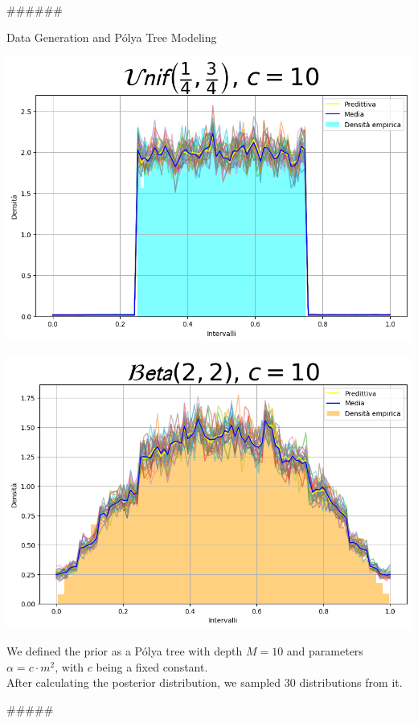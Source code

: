 \documentclass{beamer}
\begin{document}
######

\begin{frame}{Data Generation and Pólya Tree Modeling}
\begin{minipage}{0.5\textwidth}
    \includegraphics[width=\textwidth]{Unif1.png}

    \bigskip
    
    \includegraphics[width=\textwidth]{Gaus1.png}

  \end{minipage}
  \hfill
  \begin{minipage}{0.45\textwidth}
    We defined the prior as a Pólya tree with depth \( M = 10 \) and parameters \( \alpha = c \cdot m^2 \), with \( c \) being a fixed constant. \\
    
    After calculating the posterior distribution, we sampled 30 distributions from it.
  \end{minipage}
\end{frame}
#####
\end{document}
